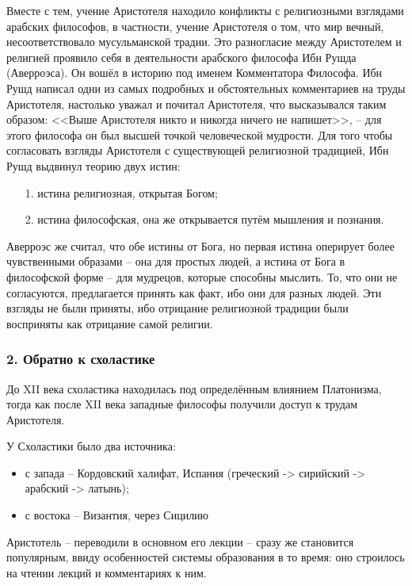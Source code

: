 \documentclass[a4paper, 12pt]{book} %
\begin{document}
Вместе с тем, учение Аристотеля находило конфликты с религиозными взглядами арабских философов, в частности, учение Аристотеля о том, что мир вечный, несоответствовало мусульманской традии. Это разногласие между Аристотелем и религией проявило себя в деятельности арабского философа Ибн Рушда (Аверроэса). Он вошёл в историю под именем Комментатора Философа. Ибн Рушд написал одни из самых подробных и обстоятельных комментариев на труды Аристотеля, настолько уважал и почитал Аристотеля, что высказывался таким образом: <<Выше Аристотеля никто и никогда ничего не напишет>>, -- для этого философа он был высшей точкой человеческой мудрости. Для того чтобы согласовать взгляды Аристотеля с существующей религиозной традицией, Ибн Рушд выдвинул теорию двух истин:
\begin{itemize}
\item[1.] истина религиозная, открытая Богом;
\item[2.] истина философская, она же открывается путём мышления и познания.
\end{itemize}
Аверроэс же считал, что обе истины от Бога, но первая истина оперирует более чувственными образами -- она для простых людей, а истина от Бога в философской форме -- для мудрецов, которые способны мыслить. То, что они не согласуются, предлагается принять как факт, ибо они для разных людей. Эти взгляды не были приняты, ибо отрицание религиозной традиции были восприняты как отрицание самой религии.

\newpage

\subsubsection*{2. Обратно к схоластике}

До XII века схоластика находилась под определённым влиянием Платонизма, тогда как после XII века западные философы получили доступ к трудам Аристотеля.

У Схоластики было два источника:
\begin{itemize}
\item с запада -- Кордовский халифат, Испания (греческий -> сирийский -> арабский -> латынь);
\item с востока -- Византия, через Сицилию
\end{itemize}

Аристотель -- переводили в основном его лекции -- сразу же становится популярным, ввиду особенностей системы образования в то время: оно строилось на чтении лекций и комментариях к ним.
\end{document}
